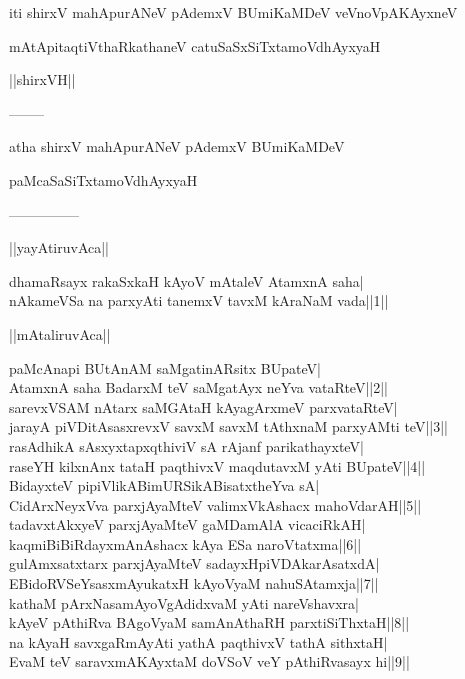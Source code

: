 \documentclass{article}
\begin{document}
\begin{center}
iti shirxV mahApurANeV pAdemxV BUmiKaMDeV veVnoVpAKAyxneV
\end{center}

\begin{center}
mAtApitaqtiVthaRkathaneV catuSaSxSiTxtamoVdhAyxyaH
\end{center}

\begin{center}
||shirxVH||
\end{center}

\begin{center}
--------
\end{center}

\begin{center}
atha shirxV mahApurANeV pAdemxV BUmiKaMDeV
\end{center}

\begin{center}
paMcaSaSiTxtamoVdhAyxyaH
\end{center}

\begin{center}

---------------
\end{center}

\begin{center}
||yayAtiruvAca||
\end{center}

dhamaRsayx rakaSxkaH kAyoV mAtaleV AtamxnA saha|\\
nAkameVSa na parxyAti tanemxV tavxM kAraNaM vada||1||

\begin{center}
||mAtaliruvAca||
\end{center}

paMcAnapi BUtAnAM saMgatinARsitx BUpateV|\\
AtamxnA saha BadarxM teV saMgatAyx neYva vataRteV||2||\\
sarevxVSAM nAtarx saMGAtaH kAyagArxmeV parxvataRteV|\\
jarayA piVDitAsasxrevxV savxM savxM tAthxnaM parxyAMti teV||3||\\
rasAdhikA sAsxyxtapxqthiviV sA rAjanf parikathayxteV|\\
raseYH kilxnAnx tataH paqthivxV maqdutavxM yAti BUpateV||4||\\
BidayxteV pipiVlikABimURSikABisatxtheYva sA|\\
CidArxNeyxVva parxjAyaMteV valimxVkAshacx mahoVdarAH||5||\\
tadavxtAkxyeV parxjAyaMteV gaMDamAlA vicaciRkAH|\\
kaqmiBiBiRdayxmAnAshacx kAya ESa naroVtatxma||6||\\
gulAmxsatxtarx parxjAyaMteV sadayxHpiVDAkarAsatxdA|\\
EBidoRVSeYsasxmAyukatxH kAyoVyaM nahuSAtamxja||7||\\
kathaM pArxNasamAyoVgAdidxvaM yAti nareVshavxra|\\
kAyeV pAthiRva BAgoVyaM samAnAthaRH parxtiSiThxtaH||8||\\
na kAyaH savxgaRmAyAti yathA paqthivxV tathA sithxtaH|\\
EvaM teV saravxmAKAyxtaM doVSoV veY pAthiRvasayx hi||9||
\end{document}
